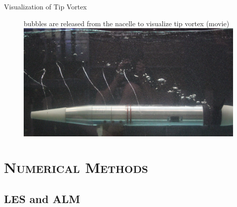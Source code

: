 \documentclass[xcolor=x11names,compress]{beamer}
\renewcommand{\(}{\begin{columns}}
\renewcommand{\)}{\end{columns}}
\newcommand{\<}[1]{\begin{column}{#1}}
\renewcommand{\>}{\end{column}}
\begin{document}
		\begin{frame}{Visualization of Tip Vortex}

		\begin{figure}[p]
		    \item bubbles are released from the nacelle to visualize tip vortex (movie)
		    \centering
		    \includegraphics[width=1.0\textwidth]{figures/turbine_tip_vortex_and_bubbles.png}
		    \label{fig:tip-vortex-and-bubbles}
		\end{figure}


	\end{frame}

\section{\scshape Numerical Methods}

\subsection{LES and ALM}
\end{document}
